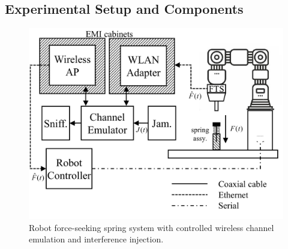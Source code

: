 	\subsection{Experimental Setup and Components}
	
	\begin{figure}[bp]
	    \centering
	    \includegraphics[width=0.85\columnwidth]{./chapter-ftml/diagrams/robotsetup}
	    \caption{Robot force-seeking spring system with controlled wireless channel emulation and interference injection.}
	    \label{fig:robotsetup}
	\end{figure}
	
	
